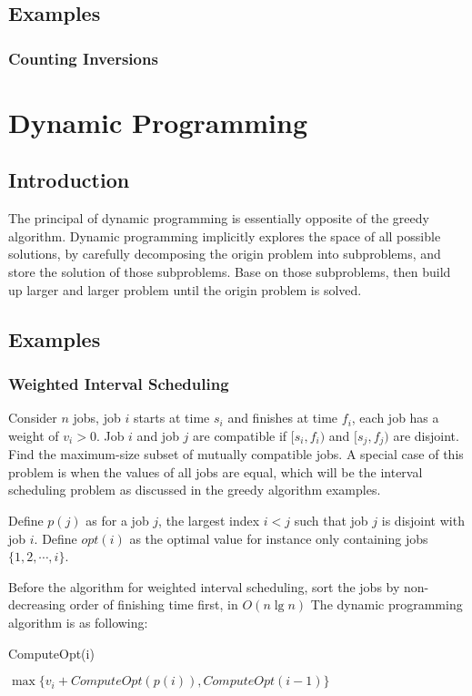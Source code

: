 				\subsection{Examples}
					\subsubsection{Counting Inversions}

			\section{Dynamic Programming}
				\subsection{Introduction}
					The principal of dynamic programming is essentially opposite of the greedy algorithm. Dynamic programming implicitly explores the space of all possible solutions, by carefully decomposing the origin problem into subproblems, and store the solution of those subproblems. Base on those subproblems, then build up larger and larger problem until the origin problem is solved.

				\subsection{Examples}
					\subsubsection{Weighted Interval Scheduling}
						Consider $n$ jobs, job $i$ starts at time $s_i$ and finishes at time $f_i$, each job has a weight of $v_i > 0$. Job $i$ and job $j$ are compatible if $[s_i, f_i)$ and $[s_j, f_j)$ are disjoint. Find the maximum-size subset of mutually compatible jobs. A special case of this problem is when the values of all jobs are equal, which will be the interval scheduling problem as discussed in the greedy algorithm examples.

						Define $p(j)$ as for a job $j$, the largest index $i < j$ such that job $j$ is disjoint with job $i$. Define $opt(i)$ as the optimal value for instance only containing jobs $\{1, 2, \cdots, i\}$.

						Before the algorithm for weighted interval scheduling, sort the jobs by non-decreasing order of finishing time first, in $O(n \lg n)$ The dynamic programming algorithm is as following:
						\begin{algorithm}[h]
							\caption{ComputeOpt(i)}
							\begin{algorithmic}[1]
									\State {}
								\Else
									\State \Return $\max\{v_i + ComputeOpt(p(i)), ComputeOpt(i - 1)\}$
								\EndIf
							\end{algorithmic}
						\end{algorithm}

